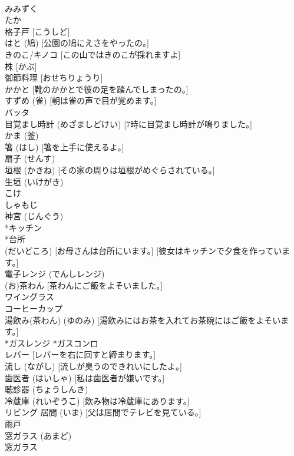 \documentclass[8pt]{extreport}
\begin{document}
\begin{CJK}{UTF8}{min}
\\	みみずく
\\	たか
\\	格子戸 [こうしど]
\\	はと (鳩) [公園の鳩にえさをやったの。]
\\	きのこ/キノコ [この山ではきのこが採れますよ]
\\	株 [かぶ]
\\	御節料理 [おせちりょうり]
\\	かかと [靴のかかとで彼の足を踏んでしまったの。]
\\	すずめ (雀) [朝は雀の声で目が覚めます。]
\\	バッタ
\\	目覚まし時計 (めざましどけい) [7時に目覚まし時計が鳴りました。]
\\	かま (釜)
\\	箸 (はし) [箸を上手に使えるよ。]
\\	扇子 (せんす)
\\	垣根 (かきね) [その家の周りは垣根がめぐらされている。]
\\	生垣 (いけがき)
\\	こけ
\\	しゃもじ
\\	神宮 (じんぐう)
\\	*キッチン 
\\	*台所 
\\	(だいどころ) [お母さんは台所にいます。] [彼女はキッチンで夕食を作っています。]
\\	電子レンジ (でんしレンジ)
\\	(お)茶わん [茶わんにご飯をよそいました。]
\\	ワイングラス
\\	コーヒーカップ
\\	湯飲み(茶わん) (ゆのみ) [湯飲みにはお茶を入れてお茶碗にはご飯をよそいます。]
\\	*ガスレンジ *ガスコンロ
\\	レバー [レバーを右に回すと締まります。]
\\	流し (ながし) [流しが臭うのできれいにしたよ。]
\\	歯医者 (はいしゃ) [私は歯医者が嫌いです。]
\\	聴診器 (ちょうしんき)
\\	冷蔵庫 (れいぞうこ) [飲み物は冷蔵庫にあります。]
\\	リビング 居間 (いま) [父は居間でテレビを見ている。]
\\	雨戸 
\\	窓ガラス (あまど)
\\	窓ガラス 

\end{CJK}
\end{document}
